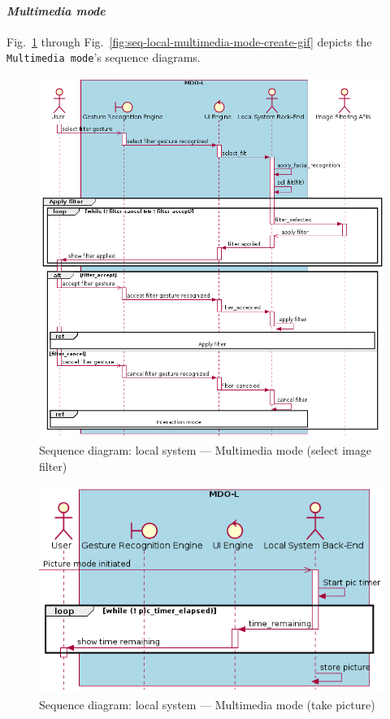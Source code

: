 \paragraph{\emph{Multimedia mode}}
Fig.~\ref{fig:seq-local-multimedia-mode-sel-filt} through
Fig.~\ref{fig:seq-local-multimedia-mode-create-gif} depicts the
\texttt{Multimedia mode}'s sequence diagrams. 
%
\begin{figure}[htb!]
  \centering
  \includegraphics[width=0.8\columnwidth]{./img/seq-local-multimedia-mode-sel-filt.png}
  \caption{Sequence diagram: local system --- Multimedia mode (select image filter)}%
\label{fig:seq-local-multimedia-mode-sel-filt}
\end{figure}
%
\begin{figure}[htb!]
  \centering
  \includegraphics[width=0.55\columnwidth]{./img/seq-local-multimedia-mode-take-pic.png}
  \caption{Sequence diagram: local system --- Multimedia mode (take picture)}%
\label{fig:seq-local-multimedia-mode-take-pic}
\end{figure}
%
